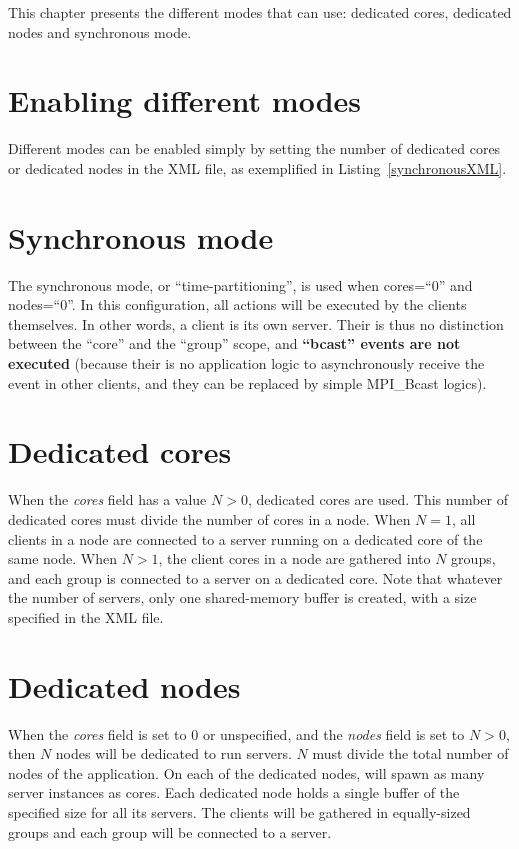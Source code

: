 This chapter presents the different modes that \Damaris{} can use: dedicated cores, dedicated nodes
and synchronous mode.

\section{Enabling different modes}

Different modes can be enabled simply by setting the number of dedicated cores or dedicated nodes
in the XML file, as exemplified in Listing~\ref{synchronousXML}.

\noindent\begin{minipage}{\textwidth}
\vspace{0.5cm}

\end{minipage}

\section{Synchronous mode}

The synchronous mode, or ``time-partitioning'', is used when cores=``0'' and nodes=``0''. In this configuration,
all actions will be executed by the clients themselves. In other words, a client is its own server.
Their is thus no distinction between the ``core'' and the ``group'' scope, and \textbf{``bcast'' events
are not executed} (because their is no application logic to asynchronously receive the event
in other clients, and they can be replaced by simple MPI\_Bcast logics).

\section{Dedicated cores}

When the \emph{cores} field has a value $N > 0$, dedicated cores are used. This number of dedicated
cores must divide the number of cores in a node. When $N=1$, all clients in a node are connected to
a server running on a dedicated core of the same node. When $N > 1$, the client cores in a node
are gathered into $N$ groups, and each group is connected to a server on a dedicated core.
Note that whatever the number of servers, only one shared-memory buffer is created, with a size
specified in the XML file.

\section{Dedicated nodes}

When the \emph{cores} field is set to 0 or unspecified, and the \emph{nodes} field is set to $N > 0$,
then $N$ nodes will be dedicated to run servers. $N$ must divide the total number of nodes of the
application. On each of the dedicated nodes, \Damaris{} will spawn as many
server instances as cores. Each dedicated node holds a single buffer of the specified size for all
its servers. The clients will be gathered in equally-sized groups and each group will be connected to
a server.